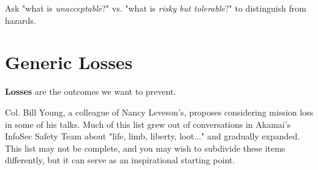 \documentclass[letterpaper]{tufte-book}
\begin{document}

Ask "what is \emph{unacceptable}?" vs. "what is \emph{risky but tolerable}?" to distinguish from hazards.

\section{Generic Losses}


\textbf{Losses} are the outcomes we want to prevent.


Col. Bill Young, a colleague of Nancy Leveson's, proposes considering mission loss in some of his talks.
Much of this list grew out of conversations in Akamai's InfoSec Safety Team about "life, limb, liberty, loot..." and gradually expanded. This list may not be complete, and you may wish to subdivide these items differently, but it can serve as an inspirational starting point.
\end{document}

